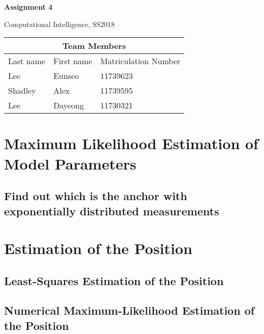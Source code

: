 \documentclass[a4paper]{article}
\begin{document}
	\begin{titlepage}
		\centering
		{\huge \bf Assignment 4\par}
		\vspace{1cm}
		{\Large Computational Intelligence, SS2018\par}
		\vspace{1cm}
		\begin{tabular}{|l|l|l|}
			\hline
			\multicolumn{3}{|c|}{\textbf{Team Members}}   \\ \hline
			Last name & First name & Matriculation Number \\ \hline
			Lee       & Eunseo     & 11739623             \\ \hline
			Shadley   & Alex       & 11739595             \\ \hline
			Lee       & Dayeong    & 11730321             \\ \hline
		\end{tabular}
	\end{titlepage}

\section{Maximum Likelihood Estimation of Model Parameters}
\subsection{Find out which is the anchor with exponentially distributed measurements}



\section{Estimation of the Position}
\subsection{Least-Squares Estimation of the Position}
\subsection{Numerical Maximum-Likelihood Estimation of the Position}
\end{document}
